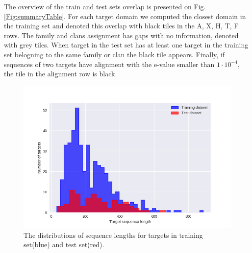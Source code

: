 The overview of the train and test sets overlap is presented on Fig. \ref{Fig:summaryTable}. 
For each target domain we computed the closest domain in the 
training set and denoted this overlap with black tiles in the A, X, H, T, F rows. The family and clans assignment has gaps with no information, 
denoted with grey tiles. When target in the test set has at least one target in the training set belogning to the same family or clan the black 
tile appears. Finally, if sequences of two targets have alignment with the e-value smaller than $1\cdot10^{-4}$, the tile in the alignment row is 
black.

\begin{figure}[H]
    \centering
    \includegraphics[width=\linewidth]{Fig/datasetLengthDistributions.png}
    \caption{The distributions of sequence lengths for targets in training set(blue) and test set(red).}
    \label{Fig:dataLengthDist}
\end{figure}


